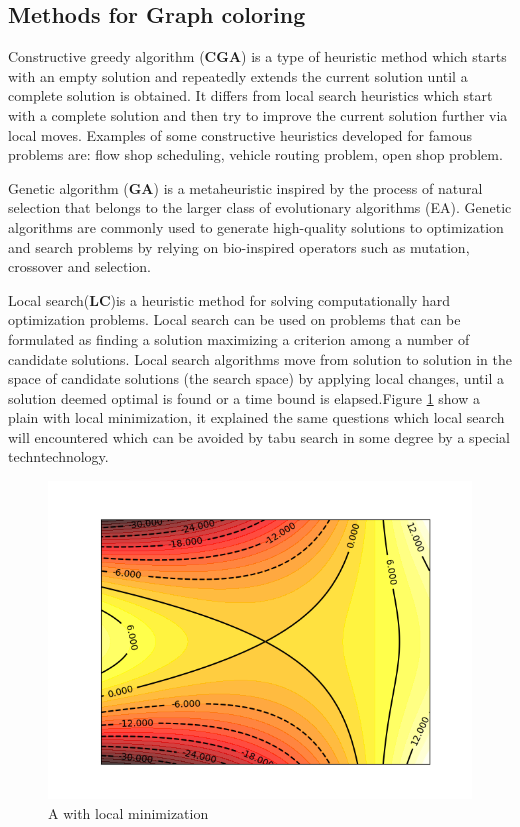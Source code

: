 \documentclass[10pt, a4paper, twocolumn]{article} %
\begin{document}
\subsection{Methods for Graph coloring}

Constructive greedy algorithm (\textbf{CGA}) is a type of heuristic
method which starts with an empty solution and repeatedly extends the current
solution until a complete solution is obtained. It differs from local search
heuristics which start with a complete solution and then try to improve the
current solution further via local moves. Examples of some constructive
heuristics developed for famous problems are: flow shop scheduling, vehicle
routing problem, open shop problem.

Genetic algorithm (\textbf{GA}) is a metaheuristic inspired by the process of natural
selection that belongs to the larger class of evolutionary algorithms (EA).
Genetic algorithms are commonly used to generate high-quality solutions to
optimization and search problems by relying on bio-inspired operators such as
mutation, crossover and selection.

Local search(\textbf{LC})is a heuristic method for solving computationally hard optimization
problems. Local search can be used on problems that can be formulated as finding
a solution maximizing a criterion among a number of candidate solutions. Local
search algorithms move from solution to solution in the space of candidate
solutions (the search space) by applying local changes, until a solution deemed
optimal is found or a time bound is elapsed.Figure \ref{intro} show a plain with
local minimization, it explained the same questions which local search will
encountered which can be avoided by tabu search in some degree by a special
techntechnology.
\begin{figure}
	\includegraphics[width=\linewidth]{intro.png} %
	\caption{A with local minimization} %
	\label{intro} %
\end{figure}
\end{document}
